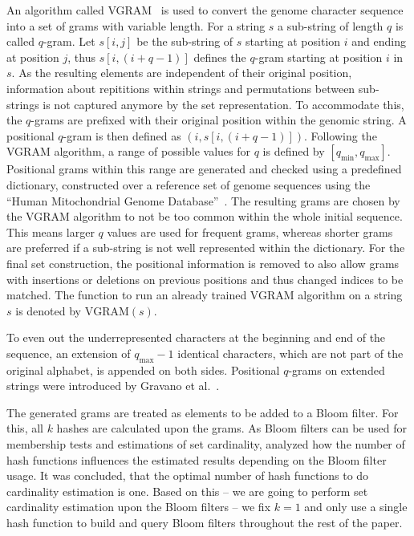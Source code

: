 \documentclass{llncs}
\begin{document}
An algorithm called VGRAM~\cite{Li07} is used to convert the genome character sequence into a set of grams with variable length.
For a string $s$ a sub-string of length $q$ is called $q$-gram.
Let $s[i,j]$ be the sub-string of $s$ starting at position $i$ and ending at position $j$, thus $s[i,\left(i+q-1\right)]$ defines the $q$-gram starting at position $i$ in $s$.
As the resulting elements are independent of their original position, information about repititions within strings and permutations between sub-strings is not captured anymore by the set representation.
To accommodate this, the $q$-grams are prefixed with their original position within the genomic string.
A positional $q$-gram is then defined as $\left(i,s[i,\left(i+q-1\right)]\right)$.
Following the VGRAM algorithm, a range of possible values for $q$ is defined by $[q_{\text{min}},q_{\text{max}}]$.
Positional grams within this range are generated and checked using a predefined dictionary, constructed over a reference set of genome sequences using the ``Human Mitochondrial Genome Database''~\cite{mtDnaDb06}.
The resulting grams are chosen by the VGRAM algorithm to not be too common within the whole initial sequence.
This means larger $q$ values are used for frequent grams, whereas shorter grams are preferred if a sub-string is not well represented within the dictionary.
For the final set construction, the positional information is removed to also allow grams with insertions or deletions on previous positions and thus changed indices to be matched.
The function to run an already trained VGRAM algorithm on a string $s$ is denoted by $\text{VGRAM}(s)$.











To even out the underrepresented characters at the beginning and end of the sequence, an extension of $q_{\text{max}}-1$ identical characters, which are not part of the original alphabet, is appended on both sides. Positional $q$-grams on extended strings were introduced by Gravano et al.~\cite{Gra01}.

The generated grams are treated as elements to be added to a Bloom filter.
For this, all $k$ hashes are calculated upon the grams.
As Bloom filters can be used for membership tests and estimations of set
cardinality, \cite{PapSib10} analyzed how the number of hash functions
influences the estimated results depending on the Bloom filter usage.
It was concluded, that the optimal number of hash functions to do cardinality
estimation is one.
Based on this -- we are going to perform set cardinality estimation upon the Bloom filters -- we fix $k=1$ and only use a single hash function to build and query Bloom filters throughout the rest of the paper.
\end{document}
